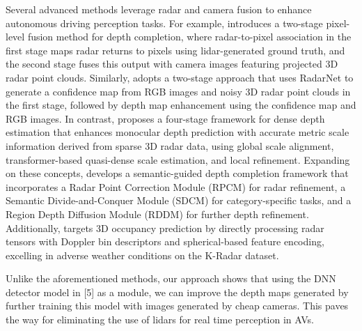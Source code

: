 Several advanced methods leverage radar and camera fusion to enhance autonomous driving perception tasks. For example, \cite{long2021radar} introduces a two-stage pixel-level fusion method for depth completion, where radar-to-pixel association in the first stage maps radar returns to pixels using lidar-generated ground truth, and the second stage fuses this output with camera images featuring projected 3D radar point clouds. Similarly, \cite{singh2023depth} adopts a two-stage approach that uses RadarNet to generate a confidence map from RGB images and noisy 3D radar point clouds in the first stage, followed by depth map enhancement using the confidence map and RGB images. In contrast, \cite{li2024radarcam} proposes a four-stage framework for dense depth estimation that enhances monocular depth prediction with accurate metric scale information derived from sparse 3D radar data, using global scale alignment, transformer-based quasi-dense scale estimation, and local refinement. Expanding on these concepts, \cite{li2024semantic} develops a semantic-guided depth completion framework that incorporates a Radar Point Correction Module (RPCM) for radar refinement, a Semantic Divide-and-Conquer Module (SDCM) for category-specific tasks, and a Region Depth Diffusion Module (RDDM) for further depth refinement. Additionally, \cite{radarocc} targets 3D occupancy prediction by directly processing radar tensors with Doppler bin descriptors and spherical-based feature encoding, excelling in adverse weather conditions on the K-Radar dataset. 
\par Unlike the aforementioned methods, our approach shows that using the DNN detector model in [5] as a module, we can improve the depth maps generated by further training this model with images generated by cheap cameras. This paves the way for eliminating the use of lidars for real time perception in AVs.





